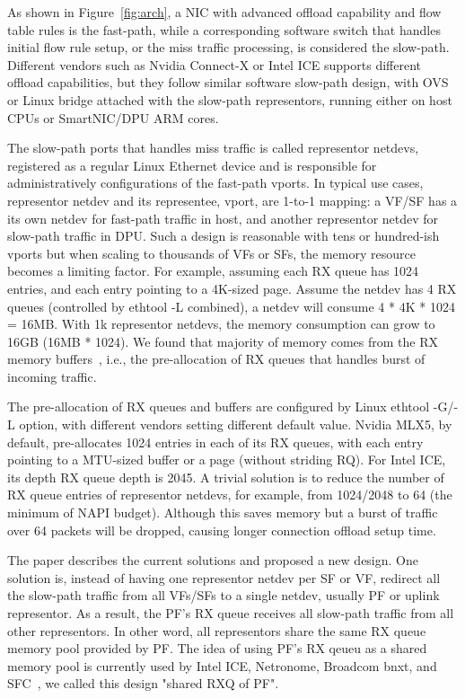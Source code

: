\documentclass[letterpaper]{article}
\begin{document}
As shown in Figure~\ref{fig:arch}, a NIC with advanced offload capability
and flow table rules is
the fast-path, while a corresponding software switch that handles
initial flow rule setup, or the miss traffic processing, is considered the
slow-path. Different vendors such as Nvidia Connect-X or Intel ICE
supports different offload capabilities, but they follow similar
software slow-path design, with OVS or Linux bridge attached with
the slow-path representors, running either on host CPUs or
SmartNIC/DPU ARM cores.

The slow-path ports that handles miss traffic is called representor
netdevs, registered as a regular Linux Ethernet device and is responsible
for administratively configurations of the fast-path vports.
In typical use cases, representor netdev and its representee, vport,
are 1-to-1 mapping: a VF/SF has a its own netdev for fast-path traffic
in host, and another representor netdev for slow-path traffic in DPU.
Such a design is reasonable with tens or hundred-ish vports but when scaling
to thousands of VFs or SFs, the memory resource becomes a limiting factor.
For example, assuming each RX queue has 1024 entries, and each entry
pointing to a 4K-sized page. Assume the netdev has 4 RX queues (controlled
by ethtool -L combined), a netdev will consume 4 * 4K * 1024 = 16MB.
With 1k representor netdevs, the memory consumption can grow
to 16GB (16MB * 1024). We found that majority of memory comes from
the RX memory buffers~\cite{jakub}, i.e., the pre-allocation of
RX queues that handles burst of incoming traffic.

The pre-allocation of RX queues and buffers are configured by Linux
ethtool -G/-L option, with different vendors setting different default
value. Nvidia MLX5, by default, pre-allocates 1024 entries in each of
its RX queues, with each entry pointing to a MTU-sized buffer or a page
(without striding RQ). For Intel ICE, its depth RX queue depth is 2045.
A trivial solution is to reduce the number of RX queue entries of
representor netdevs, for example, from 1024/2048 to 64 (the minimum of NAPI
budget). Although this saves memory but a burst of traffic over 64 packets
will be dropped, causing longer connection offload setup time.

The paper describes the current solutions and proposed a new design.
One solution is, instead of having one representor netdev per SF or VF,
redirect all the slow-path traffic from all VFs/SFs to a single netdev,
usually PF or uplink representor. As a result, the PF's RX queue receives
all slow-path traffic from all other representors. In other word, all representors
share the same RX queue memory pool provided by PF. The idea of using PF's
RX qeueu as a shared memory pool is currently used by Intel ICE, Netronome,
Broadcom bnxt, and SFC~\cite{survey}, we called this design "shared RXQ of PF".
\end{document}
